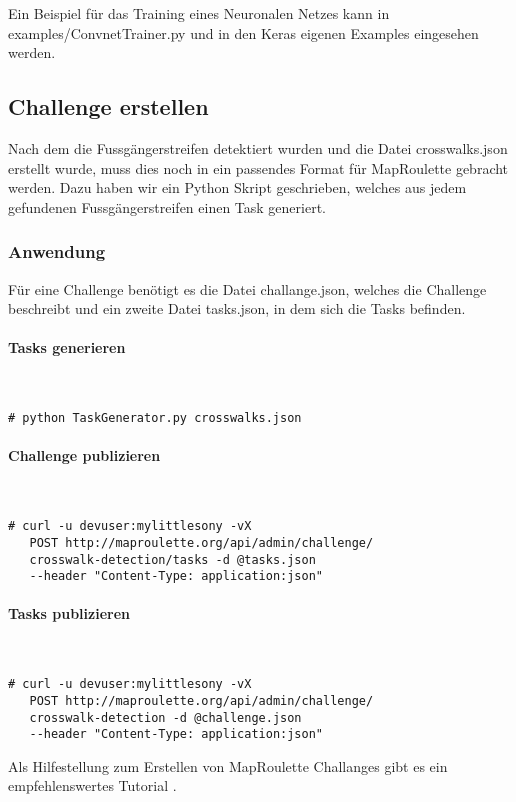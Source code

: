 Ein Beispiel für das Training eines Neuronalen Netzes kann in examples/ConvnetTrainer.py und in den Keras eigenen Examples eingesehen werden.
\newpage
\subsection{Challenge erstellen}
Nach dem die Fussgängerstreifen detektiert wurden und die Datei crosswalks.json erstellt wurde, muss dies noch in ein passendes Format für MapRoulette gebracht werden. Dazu haben wir ein Python Skript geschrieben, welches aus jedem gefundenen Fussgängerstreifen einen Task generiert.

\subsubsection{Anwendung}
Für eine Challenge benötigt es die Datei challange.json, welches die Challenge beschreibt und ein zweite Datei tasks.json, in dem sich die Tasks befinden.\\

\paragraph{Tasks generieren}\mbox{}\\
\begin{lstlisting}[style=BashInputStyle]
 # python TaskGenerator.py crosswalks.json
\end{lstlisting}

\paragraph{Challenge publizieren}\mbox{}\\
\begin{lstlisting}[style=BashInputStyle]
 # curl -u devuser:mylittlesony -vX 
   POST http://maproulette.org/api/admin/challenge/
   crosswalk-detection/tasks -d @tasks.json 
   --header "Content-Type: application:json"
\end{lstlisting}

\paragraph{Tasks publizieren}\mbox{}\\
\begin{lstlisting}[style=BashInputStyle]
 # curl -u devuser:mylittlesony -vX 
   POST http://maproulette.org/api/admin/challenge/
   crosswalk-detection -d @challenge.json 
   --header "Content-Type: application:json"
\end{lstlisting}


Als Hilfestellung zum Erstellen von MapRoulette Challanges gibt es ein empfehlenswertes Tutorial \cite{Tutorial}.